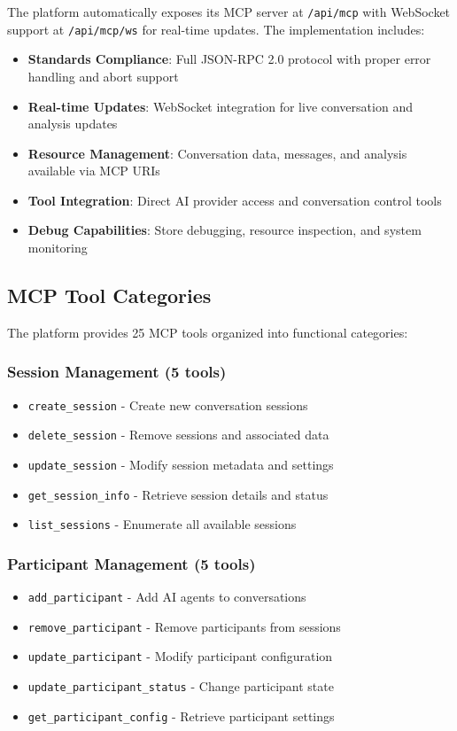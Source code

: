 \documentclass[11pt,letterpaper]{article}
\begin{document}
The platform automatically exposes its MCP server at \texttt{/api/mcp} with WebSocket support at \texttt{/api/mcp/ws} for real-time updates. The implementation includes:

\begin{itemize}
    \item \textbf{Standards Compliance}: Full JSON-RPC 2.0 protocol with proper error handling and abort support
    \item \textbf{Real-time Updates}: WebSocket integration for live conversation and analysis updates
    \item \textbf{Resource Management}: Conversation data, messages, and analysis available via MCP URIs
    \item \textbf{Tool Integration}: Direct AI provider access and conversation control tools
    \item \textbf{Debug Capabilities}: Store debugging, resource inspection, and system monitoring
\end{itemize}

\subsection{MCP Tool Categories}

The platform provides 25 MCP tools organized into functional categories:

\subsubsection{Session Management (5 tools)}
\begin{itemize}
    \item \texttt{create\_session} - Create new conversation sessions
    \item \texttt{delete\_session} - Remove sessions and associated data
    \item \texttt{update\_session} - Modify session metadata and settings
    \item \texttt{get\_session\_info} - Retrieve session details and status
    \item \texttt{list\_sessions} - Enumerate all available sessions
\end{itemize}

\subsubsection{Participant Management (5 tools)}
\begin{itemize}
    \item \texttt{add\_participant} - Add AI agents to conversations
    \item \texttt{remove\_participant} - Remove participants from sessions
    \item \texttt{update\_participant} - Modify participant configuration
    \item \texttt{update\_participant\_status} - Change participant state
    \item \texttt{get\_participant\_config} - Retrieve participant settings
\end{itemize}
\end{document}
